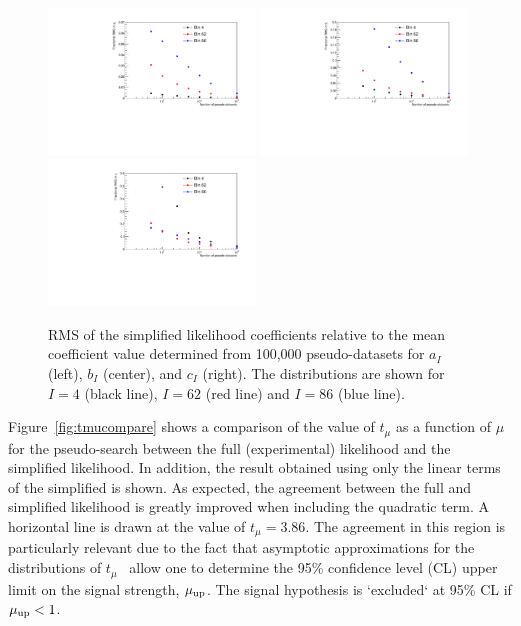 \documentclass[11pt]{article}
\begin{document}
\begin{figure}[t]
  \centering
  \includegraphics[width=0.49\textwidth]{figures/varAll_A}
  \includegraphics[width=0.49\textwidth]{figures/varAll_B}\\
  \includegraphics[width=0.49\textwidth]{figures/varAll_C}
  \caption{RMS of the simplified likelihood coefficients relative to the mean
    coefficient value determined from 100,000 pseudo-datasets for $a_{I}$
    (left), $b_{I}$ (center), and $c_{I}$ (right). The distributions are shown
    for $I=4$ (black line), $I=62$ (red line) and $I=86$ (blue line).}
  \label{fig:SLConvergence}
\end{figure}



Figure~\ref{fig:tmucompare} shows a comparison of the value of $t_{\mu}$ as a function of $\mu$ for the pseudo-search between the full (experimental)
likelihood and the simplified likelihood. In addition, the result obtained using only the linear terms of the simplified is shown. As expected, the
agreement between the full and simplified likelihood is greatly improved when including the quadratic term. A horizontal line is drawn at the value of
$t_{\mu}= 3.86$. The agreement in this region is particularly relevant due to the fact that asymptotic approximations for the distributions of $t_{\mu}$~\cite{Cowan:2010js} allow one to determine the 95\% confidence level (CL) upper limit on the signal strength, $\mu_{\rm{up}}$.
The signal hypothesis is `excluded` at 95\% CL if $\mu_{\rm{up}} < 1$.
\end{document}
